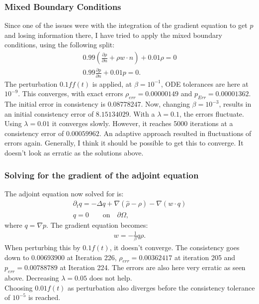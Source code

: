 \documentclass[11pt, a4paper]{article}
\theoremstyle{definition}
\begin{document}
\subsubsection*{Mixed Boundary Conditions}
Since one of the issues were with the integration of the gradient equation to get $p$ and losing information there, I have tried to apply the mixed boundary conditions, using the following split:
\begin{align*}
0.99 (\frac{\partial \rho}{\partial n} + \rho w \cdot n ) + 0.01 \rho = 0\\
0.99 \frac{\partial p }{\partial n} + 0.01 p = 0.
\end{align*}
The perturbation $0.1ff(t)$ is applied, at $\beta = 10^{-1}$, ODE tolerances are here at $10^{-9}$. This converges, with exact errors $\rho_{err} = 0.00000149$ and $p_{Err} = 0.00001362$. 
The initial error in consistency is $0.08778247$. Now, changing $\beta = 10^{-3}$, results in an initial consistency error of $8.15134029$. With a $\lambda =0.1$, the errors fluctuate. Using $\lambda = 0.01$ it converges slowly. However, it reaches 5000 iterations at a consistency error of $0.00059962$. An adaptive approach resulted in fluctuations of errors again. 
Generally, I think it should be possible to get this to converge. It doesn't look as erratic as the solutions above.

\subsubsection*{Solving for the gradient of the adjoint equation}
The adjoint equation now solved for is:
\begin{align*}
\partial_t q = - \Delta q + \nabla (\hat \rho - \rho) - \nabla (w \cdot q)\\
q = 0 \qquad \text{on} \quad \partial \Omega,
\end{align*}
where $q = \nabla p$.
The gradient equation becomes:
\begin{align*}
w = - \frac{1}{\beta}q \rho.
\end{align*}
When perturbing this by $0.1 f(t)$, it doesn't converge. The consistency goes down to $0.00693900$ at Iteration 226, $\rho_{err} = 0.00362417$ at iteration 205 and $p_{err} = 0.00788789$ at Iteration 224. The errors are also here very erratic as seen above. 
Decreasing $\lambda =0.05$ does not help.\\
Choosing $0.01f(t)$ as perturbation also diverges before the consistency tolerance of $10^{-5}$ is reached.
\end{document}
